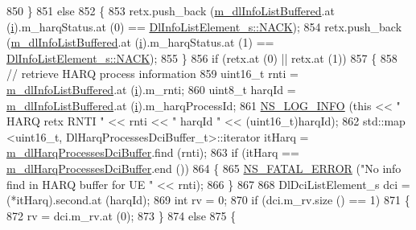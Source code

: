 \begin{DoxyCode}
850         \}
851       \textcolor{keywordflow}{else}
852         \{
853           retx.push\_back (\hyperlink{classns3_1_1PfFfMacScheduler_af3c266623addc28fc6ecd97901183a2f}{m\_dlInfoListBuffered}.at (\hyperlink{bernuolliDistribution_8m_a6f6ccfcf58b31cb6412107d9d5281426}{i}).m\_harqStatus.at (0) == 
      \hyperlink{structns3_1_1DlInfoListElement__s_a3e55b89f756b7bd8909c8116a202a17aaf90e76e67c86729b4ee21927b7fb1770}{DlInfoListElement\_s::NACK});
854           retx.push\_back (\hyperlink{classns3_1_1PfFfMacScheduler_af3c266623addc28fc6ecd97901183a2f}{m\_dlInfoListBuffered}.at (\hyperlink{bernuolliDistribution_8m_a6f6ccfcf58b31cb6412107d9d5281426}{i}).m\_harqStatus.at (1) == 
      \hyperlink{structns3_1_1DlInfoListElement__s_a3e55b89f756b7bd8909c8116a202a17aaf90e76e67c86729b4ee21927b7fb1770}{DlInfoListElement\_s::NACK});
855         \}
856       \textcolor{keywordflow}{if} (retx.at (0) || retx.at (1))
857         \{
858           \textcolor{comment}{// retrieve HARQ process information}
859           uint16\_t rnti = \hyperlink{classns3_1_1PfFfMacScheduler_af3c266623addc28fc6ecd97901183a2f}{m\_dlInfoListBuffered}.at (\hyperlink{bernuolliDistribution_8m_a6f6ccfcf58b31cb6412107d9d5281426}{i}).m\_rnti;
860           uint8\_t harqId = \hyperlink{classns3_1_1PfFfMacScheduler_af3c266623addc28fc6ecd97901183a2f}{m\_dlInfoListBuffered}.at (\hyperlink{bernuolliDistribution_8m_a6f6ccfcf58b31cb6412107d9d5281426}{i}).m\_harqProcessId;
861           \hyperlink{group__logging_gafbd73ee2cf9f26b319f49086d8e860fb}{NS\_LOG\_INFO} (\textcolor{keyword}{this} << \textcolor{stringliteral}{" HARQ retx RNTI "} << rnti << \textcolor{stringliteral}{" harqId "} << (uint16\_t)harqId);
862           std::map <uint16\_t, DlHarqProcessesDciBuffer\_t>::iterator itHarq = 
      \hyperlink{classns3_1_1PfFfMacScheduler_af3c0c393dc246b7b6a907539362c935b}{m\_dlHarqProcessesDciBuffer}.find (rnti);
863           \textcolor{keywordflow}{if} (itHarq == \hyperlink{classns3_1_1PfFfMacScheduler_af3c0c393dc246b7b6a907539362c935b}{m\_dlHarqProcessesDciBuffer}.end ())
864             \{
865               \hyperlink{group__fatal_ga5131d5e3f75d7d4cbfd706ac456fdc85}{NS\_FATAL\_ERROR} (\textcolor{stringliteral}{"No info find in HARQ buffer for UE "} << rnti);
866             \}
867 
868           DlDciListElement\_s dci = (*itHarq).second.at (harqId);
869           \textcolor{keywordtype}{int} rv = 0;
870           \textcolor{keywordflow}{if} (dci.m\_rv.size () == 1)
871             \{
872               rv = dci.m\_rv.at (0);
873             \}
874           \textcolor{keywordflow}{else}
875             \{

\end{DoxyCode}
